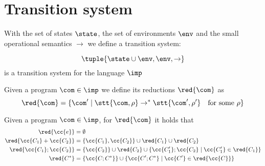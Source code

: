 \section{Transition system}

With the set of states \(\state\), the set of environments \(\env\)
and the small operational semantics \(\to\) we define a transition
system:

\begin{definition}
  \[\tuple{\state \cup \env, \env, \to}\] is a transition system for
  the language \(\imp\)
\end{definition}

\begin{definition}[Reductions]
  Given a program \(\com\in\imp\) we define its reductions
  \(\red{\com}\) as \[\red{\com} = \{\com' \mid \stt{\com, \rho} \to^*
  \stt{\com', \rho'} \quad \text{for some } \rho\}\]
\end{definition}

\begin{lemma}\label{le:tosets}
  Given a program \(\com\in\imp\), for \(\red{\com}\) it holds that
  \begin{align*}
    \red{\cc{e}} & = \emptyset \\
    \red{\cc{C_1} + \cc{C_2}} & = \{\cc{C_1}, \cc{C_2}\}\cup\red{C_1}\cup\red{C_2} \\
    \red{\cc{C_1};\cc{C_2}} & = \{\cc{C_2}\}\cup\red{C_2}\cup\{\cc{C_1'};\cc{C_2} \mid \cc{C_1'}\in\red{C_1}\} \\
    \red{C^*} & = \{\cc{C;C^*}\} \cup \{\cc{C';C^*} \mid \cc{C'}\in\red{\cc{C}}\}
  \end{align*}
\end{lemma}

